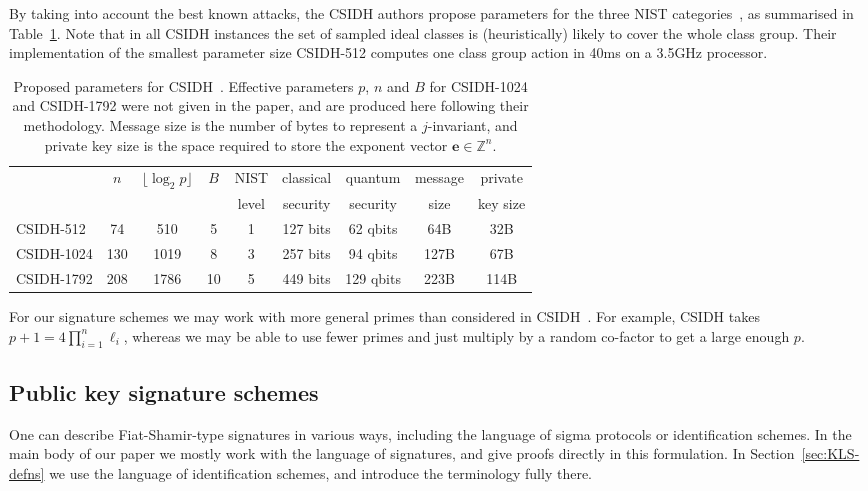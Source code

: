 \documentclass{llncs}
\newcommand{\Z}{\mathbb{Z}}
\newcommand{\e}{\mathbf{e}}
\begin{document}
By taking into account the best known attacks, the CSIDH authors propose parameters for the three NIST categories~\cite{NIST2016}, as summarised in Table~\ref{tab:csidh-parms}.
Note that in all CSIDH instances the set of sampled ideal classes is (heuristically) likely to cover the whole class group.
Their implementation of the smallest parameter size CSIDH-512 computes one class group action in 40ms on a 3.5GHz processor.


\begin{table}
  \centering
  \begin{tabular}{l | c | c | c | c | c | c | c | c}
    & $n$ & $\lfloor\log_2 p\rfloor$ & $B$ & NIST  & classical  & quantum  & message  & private  \\
    &   &  &  & level &   security &   security &   size &  key size \\

    \hline
    CSIDH-512 &  74 &  510 &  5 & 1 & 127 bits &  62 qbits &  64B &  32B\\
    CSIDH-1024 & 130 & 1019 &  8 & 3 & 257 bits &  94 qbits & 127B &  67B\\
    CSIDH-1792 & 208 & 1786 & 10 & 5 & 449 bits & 129 qbits & 223B & 114B
  \end{tabular}
  \caption{Proposed parameters for CSIDH~\cite{CLMPR18}.  Effective
    parameters $p$, $n$ and $B$ for CSIDH-1024 and CSIDH-1792 were not given
    in the paper, and are produced here following their methodology.
    Message size is the number of bytes to represent a $j$-invariant, and private key size is the space required to store the exponent vector $\e \in \Z^n$.}
  \label{tab:csidh-parms}
\end{table}




For our signature schemes we may work with more general primes than considered in CSIDH~\cite{CLMPR18}. For example, CSIDH takes $p+1 = 4\prod_{i=1}^n\ell_i$, whereas we may be able to use fewer primes and just multiply by a random co-factor to get a large enough $p$.




\subsection{Public key signature schemes}

One can describe Fiat-Shamir-type signatures in various ways, including the language of sigma protocols or identification schemes.
In the main body of our paper we mostly work with the language of signatures, and give proofs directly in this formulation.
In Section~\ref{sec:KLS-defns} we use the language of identification schemes, and introduce the terminology fully there.
\end{document}
